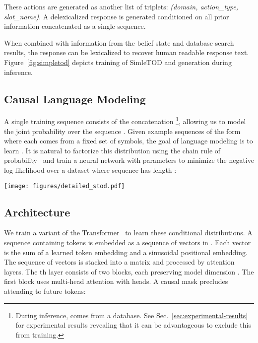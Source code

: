 \documentclass{article}
\begin{document}
These actions are generated as another list of triplets: \textit{(domain, action\_type, slot\_name)}.
A delexicalized response  is generated conditioned on all prior information concatenated as a single sequence. 






When combined with information from the belief state and database search results, the response can be lexicalized to recover human readable response text.  Figure~\ref{fig:simpletod} depicts training of SimleTOD and generation during inference.









\subsection{Causal Language Modeling} 
\label{ssec:lm}
A single training sequence consists of the concatenation 
\footnote{During inference,  comes from a database. See Sec.~\ref{sec:experimental-results} for experimental results revealing that it can be advantageous to exclude this from training.}, 
allowing us to model the joint probability over the sequence . 
Given example sequences of the form  where each  comes from a fixed set of symbols, the goal of language modeling is to learn . 
It is natural to factorize this distribution using the chain rule of probability~\citep{bengio2003neural}
and train a neural network with parameters  to minimize the negative log-likelihood over a dataset  where sequence  has length : 



\begin{figure*}[htb!]
\centering
\texttt{[image: figures/detailed\_stod.pdf]}\\

  \caption{SimpleTOD is a simple approach to task-oriented dialogue that approaches all of task-oriented dialogue as a single sequence generation problem, querying a database for necessary information. 
}
  \label{fig:simpletod}
\end{figure*}

\subsection{Architecture} 
\label{ssec:architecture}

We train a variant of the Transformer~\citep{vaswani2017attention} to learn these conditional distributions.
A sequence containing  tokens is embedded as a sequence of  vectors in .
Each vector is the sum of a learned token embedding and a sinusoidal positional embedding.
The sequence of vectors is stacked into a matrix  and processed by  attention layers.
The th layer consists of two blocks, 
each preserving model dimension .
The first block uses multi-head attention with  heads.
A causal mask precludes attending to future tokens:
\end{document}
